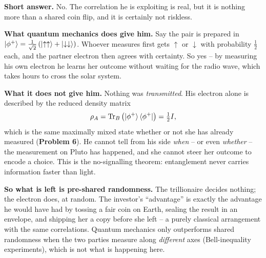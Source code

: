 \documentclass[a4paper, 10pt]{article}
\begin{document}
\begin{solution}
	\noindent \textbf{Short answer.} \( \boxed{\text{No.}} \) The correlation he is exploiting is real, but it is nothing more than a shared coin flip, and it is certainly not riskless.

	\myspace

	\noindent \textbf{What quantum mechanics does give him.} Say the pair is prepared in \( \ket{\phi^{+}} = \tfrac{1}{\sqrt{2}}\left(\ket{\uparrow\uparrow} + \ket{\downarrow\downarrow}\right) \).
	Whoever measures first gets \( \uparrow \) or \( \downarrow \) with probability \( \tfrac{1}{2} \) each, and the partner electron then agrees with certainty.
	So yes -- by measuring his own electron he learns her outcome without waiting for the radio wave, which takes hours to cross the solar system.

	\myspace
	
	\noindent \textbf{What it does not give him.} Nothing was \emph{transmitted}. His electron alone is described by the reduced density matrix
	\[
		\rho_A = \mathrm{Tr}_B \left(\ket{\phi^{+}}\bra{\phi^{+}}\right) = \tfrac{1}{2}I,
	\]
	which is the same maximally mixed state whether or not she has already measured (\textbf{Problem 6}).
	He cannot tell from his side \emph{when} -- or even \emph{whether} -- the measurement on Pluto has happened, and she cannot steer her outcome to encode a choice.
	This is the no-signalling theorem: entanglement never carries information faster than light.

	\noindent \textbf{So what is left is pre-shared randomness.} The trillionaire decides nothing; the electron does, at random.
	The investor's ``advantage'' is exactly the advantage he would have had by tossing a fair coin on Earth, sealing the result in an envelope, and shipping her a copy before she left -- a purely classical arrangement with the same correlations.
	Quantum mechanics only outperforms shared randomness when the two parties measure along \emph{different} axes (Bell-inequality experiments), which is not what is happening here.

	\myspace


\end{solution}
\end{document}

